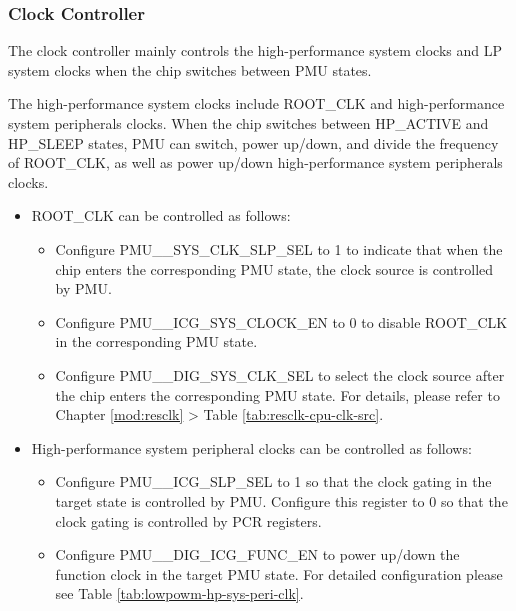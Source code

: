 \documentclass[main\_\_EN.tex]{subfiles}
\begin{document}
\subsubsection{Clock Controller}

The clock controller mainly controls the high-performance system clocks and LP system clocks when the chip switches between PMU states.

The high-performance system clocks include ROOT\_CLK and high-performance system peripherals clocks. When the chip switches between HP\_ACTIVE and HP\_SLEEP states, PMU can switch, power up/down, and divide the frequency of ROOT\_CLK, as well as power up/down high-performance system peripherals clocks.

\begin{itemize}

\item ROOT\_CLK can be controlled as follows:

    \begin{itemize}
    \item Configure PMU\_\_SYS\_CLK\_SLP\_SEL to 1 to indicate that when the chip enters the corresponding PMU state, the clock source is controlled by PMU.

    \item Configure PMU\_\_ICG\_SYS\_CLOCK\_EN to 0 to disable ROOT\_CLK in the corresponding PMU state.

    \item Configure PMU\_\_DIG\_SYS\_CLK\_SEL to select the clock source after the chip enters the corresponding PMU state. For details, please refer to Chapter \ref{mod:resclk} \textit{} > Table \ref{tab:resclk-cpu-clk-src}.
    \end{itemize}

\item High-performance system peripheral clocks can be controlled as follows:

    \begin{itemize}
    \item Configure PMU\_\_ICG\_SLP\_SEL to 1 so that the clock gating in the target state is controlled by PMU. Configure this register to 0 so that the clock gating is controlled by PCR registers.

    \item Configure PMU\_\_DIG\_ICG\_FUNC\_EN to power up/down the function clock in the target PMU state. For detailed configuration please see Table \ref{tab:lowpowm-hp-sys-peri-clk}.
    \end{itemize}


\end{itemize}
\end{document}
